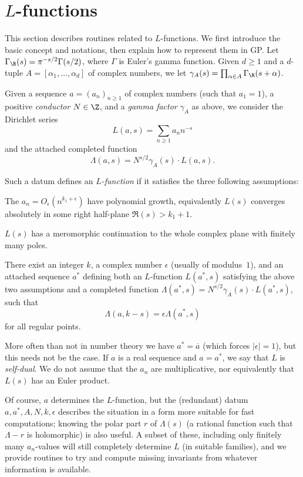 \section{$L$-functions}

This section describes routines related to $L$-functions. We first introduce
the basic concept and notations, then explain how to represent them in GP.
Let $\Gamma_\R(s) = \pi^{-s/2}\Gamma(s/2)$, where $\Gamma$ is Euler's gamma
function. Given $d \geq 1$ and a $d$-tuple $A=[\alpha_1,\dots,\alpha_d]$ of
complex numbers, we let $\gamma_A(s) = \prod_{\alpha \in A} \Gamma_\R(s +
\alpha)$.

Given a sequence $a = (a_n)_{n\geq 1}$ of complex numbers (such that $a_1 = 1$),
a positive \emph{conductor} $N \in \Z$, and a \emph{gamma factor}
$\gamma_A$ as above, we consider the Dirichlet series
$$ L(a,s) = \sum_{n\geq 1} a_n n^{-s} $$
and the attached completed function
$$ \Lambda(a,s) = N^{s/2}\gamma_A(s) \cdot L(a,s). $$

Such a datum defines an \emph{$L$-function} if it satisfies the three
following assumptions:

\item [Convergence] The $a_n = O_\epsilon(n^{k_1+\epsilon})$ have polynomial
growth, equivalently $L(s)$ converges absolutely in some right half-plane
$\Re(s) > k_1 + 1$.

\item [Analytic continuation] $L(s)$ has a meromorphic continuation to the
whole complex plane with finitely many poles.

\item [Functional equation] There exist an integer $k$, a complex number
$\epsilon$ (usually of modulus~$1$), and an attached sequence $a^*$
defining both an $L$-function $L(a^*,s)$ satisfying the above two assumptions
and a completed function $\Lambda(a^*,s) = N^{s/2}\gamma_A(s) \cdot
L(a^*,s)$, such that
$$\Lambda(a,k-s) = \epsilon \Lambda(a^*,s)$$
for all regular points.

More often than not in number theory we have $a^* = \overline{a}$ (which
forces $|\epsilon| = 1$), but this needs not be the case. If $a$ is a real
sequence and $a = a^*$, we say that $L$ is \emph{self-dual}. We do not assume
that the $a_n$ are multiplicative, nor equivalently that $L(s)$ has an Euler
product.

Of course, $a$ determines the $L$-function, but the (redundant) datum $a,a^*,
A, N, k, \epsilon$ describes the situation in a form more suitable for fast
computations; knowing the polar part $r$ of $\Lambda(s)$ (a rational function
such that $\Lambda-r$ is holomorphic) is also useful. A subset of these,
including only finitely many $a_n$-values will still completely determine $L$
(in suitable families), and we provide routines to try and compute missing
invariants from whatever information is available.

